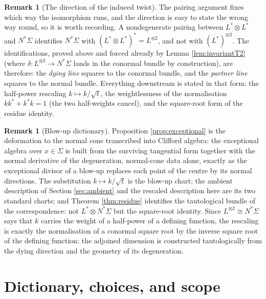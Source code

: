 \documentclass[11pt]{article}
\theoremstyle{definition}
\newtheorem{remark}[theorem]{Remark}
\newcommand{\shL}{L}
\newcommand{\Sig}{\Sigma}
\begin{document}
\begin{remark}[The direction of the induced twist]\label{rem:twistcorrection}
The pairing argument fixes which way the isomorphism runs, and the direction is easy to state the wrong way round, so it is worth recording. A nondegenerate pairing between $\shL^* \otimes \shL^*$ and $N^*\Sig$ identifies $N^*\Sig$ with $(\shL^* \otimes \shL^*)^* = \shL^{\otimes 2}$, and not with $(\shL^*)^{\otimes 2}$. The identifications, proved above and forced already by Lemma \ref{lem:invariantT2} (where $\delta : \shL^{\otimes 2} \to N^*\Sig$ lands in the conormal bundle by construction), are therefore: the \emph{dying line} squares to the conormal bundle, and the \emph{partner line} squares to the normal bundle. Everything downstream is stated in that form: the half-power rescaling $k \mapsto k/\sqrt t$, the weightlessness of the normalisation $kk^* + k^*k = 1$ (the two half-weights cancel), and the square-root form of the residue identity.
\end{remark}

\begin{remark}[Blow-up dictionary]\label{rem:blowup}
Proposition \ref{prop:exceptional} is the deformation to the normal cone \cite[Ch.~5]{Fulton1998} transcribed into Clifford algebra: the exceptional algebra over $x \in \Sig$ is built from the surviving tangential form together with the normal derivative of the degeneration, normal-cone data alone, exactly as the exceptional divisor of a blow-up replaces each point of the centre by its normal directions. The substitution $k \mapsto k/\sqrt{t}$ is the blow-up chart; the ambient description of Section \ref{sec:ambient} and the rescaled description here are its two standard charts; and Theorem \ref{thm:residue} identifies the tautological bundle of the correspondence: not $\shL^* \otimes N^*\Sig$ but the square-root identity. Since $\shL^{\otimes 2} \cong N^*\Sig$ says that $k$ carries the weight of a half-power of a defining function, the rescaling is exactly the normalisation of a conormal square root by the inverse square root of the defining function: the adjoined dimension is constructed tautologically from the dying direction and the geometry of its degeneration.
\end{remark}

\section{Dictionary, choices, and scope}\label{sec:dictionary}
\end{document}
